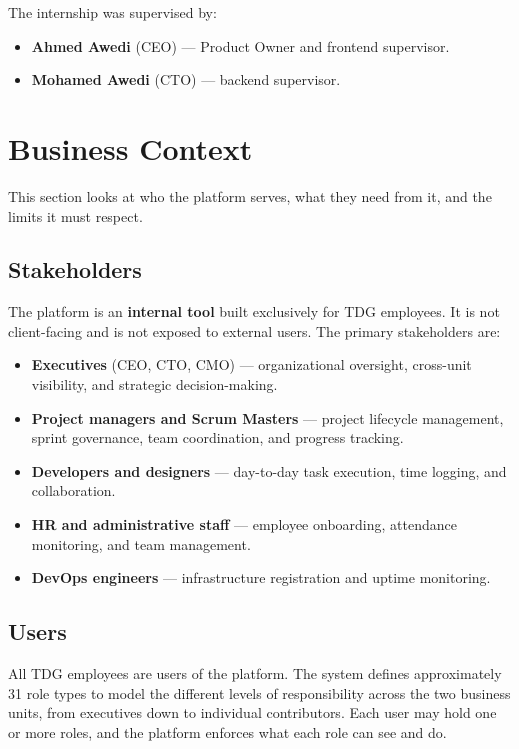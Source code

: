 The internship was supervised by:

\begin{itemize}
  \item \textbf{Ahmed Awedi} (CEO) --- Product Owner and frontend supervisor.
  \item \textbf{Mohamed Awedi} (CTO) --- backend supervisor.
\end{itemize}

\section{Business Context}

This section looks at who the platform serves, what they need from it, and the limits it must
respect.

\subsection{Stakeholders}

The platform is an \textbf{internal tool} built exclusively for TDG employees. It is not
client-facing and is not exposed to external users. The primary stakeholders are:

\begin{itemize}
  \item \textbf{Executives} (CEO, CTO, CMO) --- organizational oversight, cross-unit visibility,
    and strategic decision-making.
  \item \textbf{Project managers and Scrum Masters} --- project lifecycle management, sprint
    governance, team coordination, and progress tracking.
  \item \textbf{Developers and designers} --- day-to-day task execution, time logging, and
    collaboration.
  \item \textbf{HR and administrative staff} --- employee onboarding, attendance monitoring, and
    team management.
  \item \textbf{DevOps engineers} --- infrastructure registration and uptime monitoring.
\end{itemize}

\subsection{Users}

All TDG employees are users of the platform. The system defines approximately 31 role types to
model the different levels of responsibility across the two business units, from executives
down to individual contributors. Each user may hold one or more roles, and the platform
enforces what each role can see and do.

